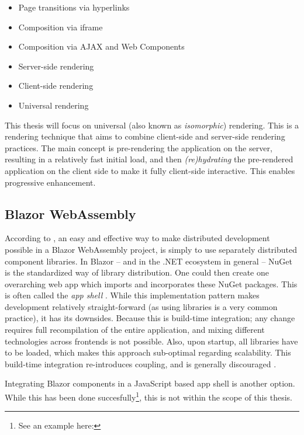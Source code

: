 \begin{itemize}
    \item Page transitions via hyperlinks
    \item Composition via iframe
    \item Composition via AJAX and Web Components
    \item Server-side rendering
    \item Client-side rendering
    \item Universal rendering
\end{itemize}

This thesis will focus on universal (also known as \textit{isomorphic})
rendering. This is a rendering technique that aims to combine client-side and
server-side rendering practices. The main concept is pre-rendering the
application on the server, resulting in a relatively fast initial load, and then
\textit{(re)hydrating} the pre-rendered application on the client side to make
it fully client-side interactive. This enables progressive enhancement.
\autocite{MillerOsmani_2019}

\subsection{Blazor WebAssembly}
According to \textcite{Rappl_MunichNETMeetup_2020}, an easy and effective way to
make distributed development possible in a Blazor WebAssembly project, is simply
to use separately distributed component libraries. In Blazor -- and in the .NET
ecosystem in general -- NuGet is the
standardized way of library distribution. One could then create one overarching
web app which imports and incorporates these NuGet packages. This is often
called the \textit{app shell} \autocite{Geers_2020}. While this implementation
pattern makes development relatively straight-forward (as using libraries is a
very common practice), it has its downsides. Because this is build-time
integration; any change requires full recompilation of the entire application,
and mixing different technologies across frontends is not possible. Also, upon
startup, all libraries have to be loaded, which makes this approach sub-optimal
regarding scalability. This build-time integration re-introduces coupling, and
is generally discouraged \autocite{Jackson_2019}.

Integrating Blazor components in a JavaScript based app shell is another option.
While this has been done succesfully\footnote{See an example here:
}, this is not
within the scope of this thesis.

